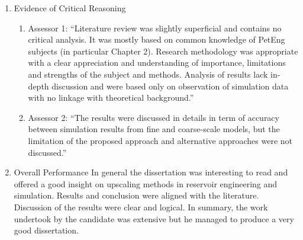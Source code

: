 \documentclass[14pt,twoside]{report}
\begin{document}
\begin{enumerate}
\begin{enumerate}
    \end{enumerate}
%  
   \item Evidence of Critical Reasoning
    \begin{enumerate}%
       \item Assessor 1: ``Literature review was slightly superficial and contains no critical analysis. It was mostly based on common knowledge of PetEng subjects (in particular Chapter 2). Research methodology was appropriate with a clear appreciation and understanding of importance, limitations and strengths of the subject and methods. Analysis of results lack in-depth discussion and were based only on observation of simulation data with no linkage with theoretical background.''
       \item Assessor 2: ``The results were discussed in details in term of accuracy between simulation results from fine and coarse-scale models, but the limitation of the proposed approach and alternative approaches were not discussed.''
    \end{enumerate}
%  
  \item Overall Performance
    In general the dissertation was interesting to read and offered a good insight on upscaling methods in reservoir engineering and simulation. Results and conclusion were aligned with the literature. Discussion of the results were clear and logical. In summary, the work undertook by the candidate was extensive but he managed to produce a very good dissertation.
%  
\end{enumerate}

\vfill
\clearpage
\end{document}
